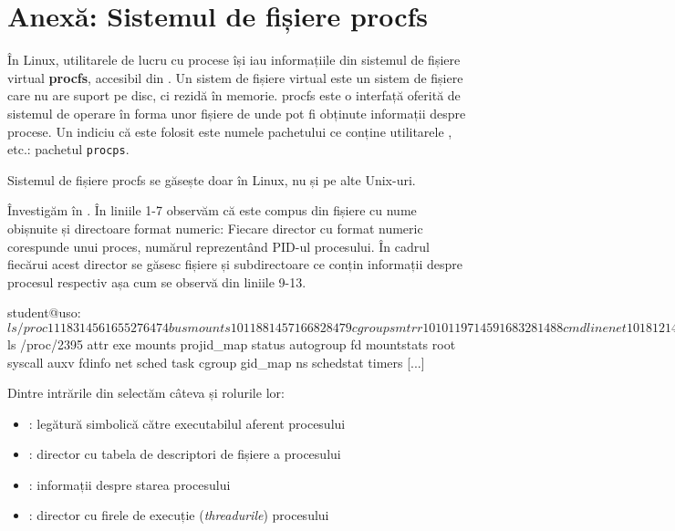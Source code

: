 \section{Anexă: Sistemul de fișiere procfs}
\label{sec:process:proc}

În Linux, utilitarele de lucru cu procese își iau informațiile din sistemul de fișiere virtual \textbf{procfs}, accesibil din .
Un sistem de fișiere virtual este un sistem de fișiere care nu are suport pe disc, ci rezidă în memorie.
procfs este o interfață oferită de sistemul de operare în forma unor fișiere de unde pot fi obținute informații despre procese.
Un indiciu că este folosit este numele pachetului ce conține utilitarele ,  etc.: pachetul \texttt{procps}.

\begin{note}
  Sistemul de fișiere procfs se găsește doar în Linux, nu și pe alte Unix-uri.
\end{note}

Învestigăm  în .
În liniile 1-7 observăm că  este compus din fișiere cu nume obișnuite și directoare format numeric: Fiecare director cu format numeric corespunde unui proces, numărul reprezentând PID-ul procesului.
În cadrul fiecărui acest director se găsesc fișiere și subdirectoare ce conțin informații despre procesul respectiv așa cum se observă din liniile 9-13.

\begin{screen}[caption={Informații din /proc},label={lst:process:proc}]
student@uso:~$ ls /proc
1      1183   1456   1655  276   474        bus          mounts
10     1188   1457   1668  28    479        cgroups      mtrr
1010   1197   1459   1683  281   488        cmdline      net
1018   12     14636  17    284   493        consoles     pagetypeinfo
1019   1202   1464   1742  287   496        cpuinfo      partitions
1032   1205   1467   176   288   498        crypto       sched_debug
[...]
student@uso:~$ ls /proc/2395
attr             exe        mounts         projid_map    status
autogroup        fd         mountstats     root          syscall
auxv             fdinfo     net            sched         task
cgroup           gid_map    ns             schedstat     timers
[...]
\end{screen}

Dintre intrările din  selectăm câteva și rolurile lor:

\begin{itemize}
  \item {}: legătură simbolică către executabilul aferent procesului
  \item {}: director cu tabela de descriptori de fișiere a procesului
  \item {}: informații despre starea procesului
  \item {}: director cu firele de execuție (\textit{threadurile}) procesului
\end{itemize}

